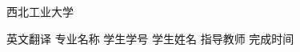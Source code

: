 \begin{titlepage}
	\voffset 2.7cm
	\begin{center}
		\begin{center}
			\begin{minipage}[c]{2.64cm}
				\centering
				\resizebox{!}{0.9cm}{ \parbox{0.54cm}{  } }
				\end{minipage}
				\hskip 0.8cm
				\begin{minipage}[c]{8cm}
				\fontsize{33}{33}\fNWPU 西北工业大学
			\end{minipage}
		\end{center}
		\vskip 0.7cm
		\sChuhao{}
		\vskip 2.5cm { \sChuhao\fHei 英文翻译 }
		\vskip 2.0cm
		{
			\sSihao\fSong 专业名称
			\vskip 0.7cm
			\sSihao\fSong 学生学号
			\vskip 0.7cm
			\sSihao\fSong 学生姓名
			\vskip 0.7cm
			\sSihao\fSong 指导教师
			\vskip 0.7cm
			\sSihao\fSong 完成时间
			\vfill
		}
	\end{center}
\end{titlepage}

\fSong \normalsize

\newpage
\thispagestyle{empty}

